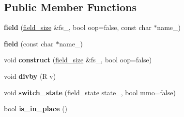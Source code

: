 \subsection*{Public Member Functions}
\begin{DoxyCompactItemize}
\item 
\hypertarget{classfield_a394818f5415834dcbc300bf5146f3357}{
{\bfseries field} (\hyperlink{structfield__size}{field\_\-size} \&fs\_\-, bool oop=false, const char $\ast$name\_)}
\label{classfield_a394818f5415834dcbc300bf5146f3357}

\item 
\hypertarget{classfield_a80228ae228b3e43f9bb04a3ab6a38a02}{
{\bfseries field} (const char $\ast$name\_)}
\label{classfield_a80228ae228b3e43f9bb04a3ab6a38a02}

\item 
\hypertarget{classfield_affd7a0214868da4208dc4bbd2ba938d4}{
void {\bfseries construct} (\hyperlink{structfield__size}{field\_\-size} \&fs\_\-, bool oop=false)}
\label{classfield_affd7a0214868da4208dc4bbd2ba938d4}

\item 
\hypertarget{classfield_a2a52cc6c193a8d2705db4eda9a96d256}{
void {\bfseries divby} (R v)}
\label{classfield_a2a52cc6c193a8d2705db4eda9a96d256}

\item 
\hypertarget{classfield_a3f6f257e24f5f6a3994c5361e84f0827}{
void {\bfseries switch\_\-state} (field\_\-state state\_\-, bool mmo=false)}
\label{classfield_a3f6f257e24f5f6a3994c5361e84f0827}

\item 
\hypertarget{classfield_a58f704053fd6528f5d80e8a3b981d4cd}{
bool {\bfseries is\_\-in\_\-place} ()}
\label{classfield_a58f704053fd6528f5d80e8a3b981d4cd}

\end{DoxyCompactItemize}
